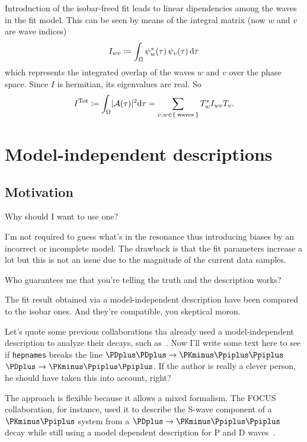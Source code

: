 \documentclass[
	10pt,
	twoside,
	openright,
]{scrbook}
\newcommand{\A}{\ensuremath{\mathcal{A}}}
\begin{document}
Introduction of the isobar-freed fit leads to linear dipendencies among the waves in the fit model.
This can be seen by means of the integral matrix (now $w$ and $v$ are wave indices)
\begin{equation}
    I_{wv} \coloneqq \int_\Omega \psi_w^*(\tau)\,\psi_v(\tau)\mathop{}\!\textup{d}\tau
\end{equation}
which represents the integrated overlap of the waves $w$ and $v$ over the phase space.
Since $I$ is hermitian, its eigenvalues are real.
So
\begin{equation}
    I^{\text{Tot}} \coloneqq \int_\Omega \abs{\A(\tau)}^2\!\ud \tau = \sum_{v,w \in \Set{\text{waves}}} T_w^* I_{wv} T_v.
\end{equation}

\section{Model-independent descriptions}

\subsection{Motivation}

Why should I want to use one?

I'm not required to guess what's in the resonance thus introducing biases by an incorrect or incomplete model.
The drawback is that the fit parameters increase a lot but this is not an issue due to the magnitude of the current data samples.


Who guarantees me that you're telling the truth and the description works?

The fit result obtained via a model-independent description have been compared to the isobar ones.
And they're compatible, you skeptical moron.


Let's quote some previous collaborations tha already used a model-independent description to analyze their decays, such as~\cite{PhysRevD.73.032004,Link200914}.
Now I'll write some text here to see if \texttt{hepnames} breaks the line $\PDplus\cramped{\PDplus} \to \PKminus\Ppiplus\Ppiplus$ $\cramped{\PDplus \to \PKminus\Ppiplus\Ppiplus}$.
If the author is really a clever person, he should have taken this into account, right?


The approach is flexible because it allows a mixed formalism.
The FOCUS collaboration, for instance, used it to describe the S-wave component of a $\PKminus\Ppiplus$ system from a $\PDplus \to \PKminus\Ppiplus\Ppiplus$ decay while still using a model dependent description for P and D waves~\cite{Link200914}.
\end{document}
